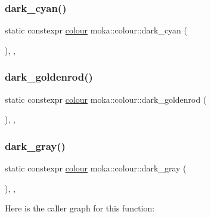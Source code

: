 \subsubsection{\texorpdfstring{dark\_cyan()}{dark\_cyan()}}
{\footnotesize\ttfamily static constexpr \mbox{\hyperlink{classmoka_1_1colour}{colour}} moka\+::colour\+::dark\+\_\+cyan (\begin{DoxyParamCaption}{ }\end{DoxyParamCaption})\hspace{0.3cm}{\ttfamily [inline]}, {\ttfamily [static]}, {\ttfamily [noexcept]}}

\mbox{\label{classmoka_1_1colour_abcfa7067af326bc6f598efd98bcf45af}} 
\subsubsection{\texorpdfstring{dark\_goldenrod()}{dark\_goldenrod()}}
{\footnotesize\ttfamily static constexpr \mbox{\hyperlink{classmoka_1_1colour}{colour}} moka\+::colour\+::dark\+\_\+goldenrod (\begin{DoxyParamCaption}{ }\end{DoxyParamCaption})\hspace{0.3cm}{\ttfamily [inline]}, {\ttfamily [static]}, {\ttfamily [noexcept]}}

\mbox{\label{classmoka_1_1colour_a58c5c69b0ce342644b52c52d72f2ed4e}} 
\subsubsection{\texorpdfstring{dark\_gray()}{dark\_gray()}}
{\footnotesize\ttfamily static constexpr \mbox{\hyperlink{classmoka_1_1colour}{colour}} moka\+::colour\+::dark\+\_\+gray (\begin{DoxyParamCaption}{ }\end{DoxyParamCaption})\hspace{0.3cm}{\ttfamily [inline]}, {\ttfamily [static]}, {\ttfamily [noexcept]}}

Here is the caller graph for this function\+:
\mbox{\label{classmoka_1_1colour_abb39a0579f25b25a2884486afcff19bc}} 
